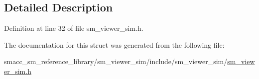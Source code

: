 \subsection{Detailed Description}


Definition at line 32 of file sm\+\_\+viewer\+\_\+sim.\+h.



The documentation for this struct was generated from the following file\+:\begin{DoxyCompactItemize}
\item 
smacc\+\_\+sm\+\_\+reference\+\_\+library/sm\+\_\+viewer\+\_\+sim/include/sm\+\_\+viewer\+\_\+sim/\hyperlink{sm__viewer__sim_8h}{sm\+\_\+viewer\+\_\+sim.\+h}\end{DoxyCompactItemize}

